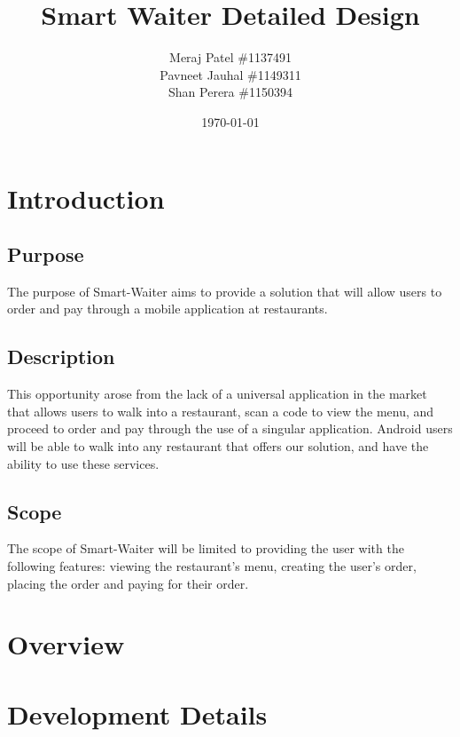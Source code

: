 \documentclass[12pt, titlepage]{article}
\begin{document}
\title{Smart Waiter Detailed Design} 
\author{Meraj Patel \#1137491 \\ Pavneet Jauhal \#1149311\\ Shan Perera \#1150394}
\date{\today}
\maketitle

\tableofcontents 

\listoffigures

\listoftables


\pagebreak

\section{Introduction}

\subsection{Purpose}
The purpose of Smart-Waiter aims to provide a solution that will allow users to order and pay through a mobile application at restaurants.

\subsection{Description}
This opportunity arose from the lack of a universal application in the market that allows users to walk into a restaurant, scan a code to view the menu, and proceed to order and pay through the use of a singular application. Android users will be able to walk into any restaurant that offers our solution, and have the ability to use these services.

\subsection{Scope}
The scope of Smart-Waiter will be limited to providing the user with the following features: viewing the restaurant's menu, creating the user's order, placing the order and paying for their order. 

\section{Overview}


\section{Development Details}
\end{document}
